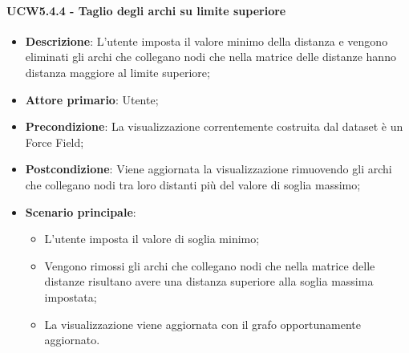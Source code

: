 \paragraph{UCW5.4.4 - Taglio degli archi su limite superiore}
\label{par:ucw5.4.4}
\begin{itemize}
    \item \textbf{Descrizione}:     L'utente imposta il valore minimo della distanza e vengono eliminati gli archi che collegano nodi che nella matrice delle distanze hanno distanza maggiore al limite superiore;
    \item \textbf{Attore primario}: Utente;
    \item \textbf{Precondizione}:   La visualizzazione correntemente costruita dal dataset è un Force Field;
    \item \textbf{Postcondizione}:  Viene aggiornata la visualizzazione rimuovendo gli archi  che collegano nodi tra loro distanti più del valore di soglia massimo;
    \item \textbf{Scenario principale}:
          \begin{itemize}
              \item L'utente imposta il valore di soglia minimo;
              \item Vengono rimossi gli archi che collegano nodi che nella matrice delle distanze risultano avere una distanza superiore alla soglia massima impostata;
              \item La visualizzazione viene aggiornata con il grafo opportunamente aggiornato.
          \end{itemize}
\end{itemize}

